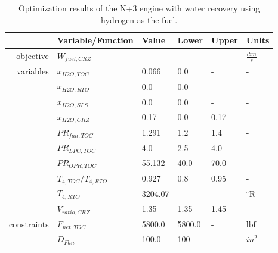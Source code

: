 \documentclass[conf]{new-aiaa}
\begin{document}
\begin{table}[h]
    \centering
    \caption{Optimization results of the N+3 engine with water recovery using hydrogen as the fuel.
    }
    \small
    \renewcommand{\arraystretch}{1.2}
    \begin{tabular}{r l l l l l}
                    & Variable/Function     & Value   & Lower  & Upper & Units           \\
        \toprule
        objective   & $W_{fuel,CRZ}$        & -       & -      & -     & $\frac{lbm}{s}$ \\
        \hline
        variables   & $x_{H2O,TOC}$         & 0.066   & 0.0    & -     & -               \\
                    & $x_{H2O,RTO}$         & 0.0     & 0.0    & -     & -               \\
                    & $x_{H2O,SLS}$         & 0.0     & 0.0    & -     & -               \\
                    & $x_{H2O,CRZ}$         & 0.17    & 0.0    & 0.17  & -               \\
                    & $PR_{fan,TOC}$        & 1.291   & 1.2    & 1.4   & -               \\
                    & $PR_{LPC,TOC}$        & 4.0     & 2.5    & 4.0   & -               \\
                    & $PR_{OPR,TOC}$        & 55.132  & 40.0   & 70.0  & -               \\
                    & $T_{4,TOC}/T_{4,RTO}$ & 0.927   & 0.8    & 0.95  & -               \\
                    & $T_{4,RTO}$           & 3204.07 & -      & -     & $^\circ$R       \\
                    & $V_{ratio,CRZ}$       & 1.35    & 1.35   & 1.45  &                 \\
        \hline
        constraints & $F_{net,TOC}$         & 5800.0  & 5800.0 & -     & lbf             \\
                    & $D_{Fan}$             & 100.0   & 100    & -     & $in^2$          \\
        \bottomrule
    \end{tabular}
    \label{tab:res_full_opt_H2}
\end{table}
\end{document}
